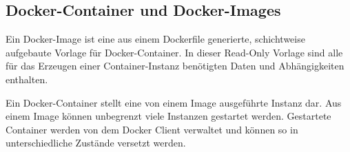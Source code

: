 \subsection{Docker-Container und Docker-Images}
\label{subsec:dockerconimage}
Ein Docker-Image ist eine aus einem Dockerfile generierte, schichtweise aufgebaute Vorlage für Docker-Container. In dieser Read-Only Vorlage sind alle für das Erzeugen einer Container-Instanz benötigten Daten und Abhängigkeiten enthalten.

Ein Docker-Container stellt eine von einem Image ausgeführte Instanz dar. Aus einem Image können unbegrenzt viele Instanzen gestartet werden. Gestartete Container werden von dem Docker Client verwaltet und können so in unterschiedliche Zustände versetzt werden.


